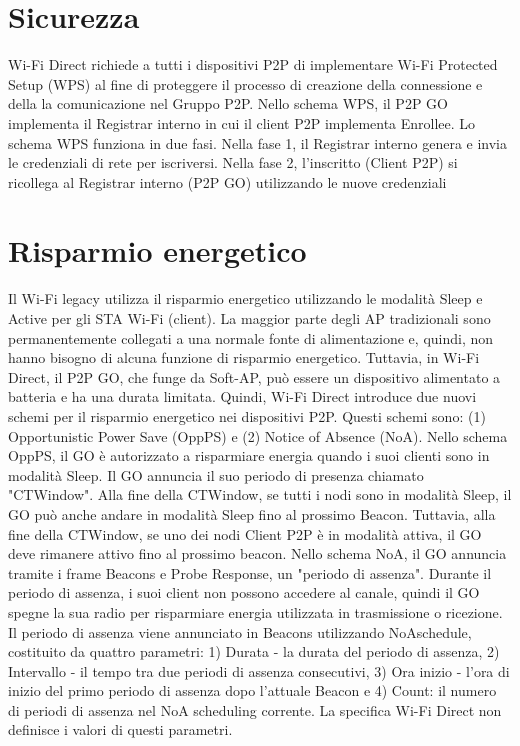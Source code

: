 \section{Sicurezza}

Wi-Fi Direct richiede a tutti i dispositivi P2P di 
implementare Wi-Fi Protected Setup (WPS) \cite{WPS} al fine di
proteggere il processo di creazione della connessione e della
la comunicazione nel Gruppo P2P. Nello schema WPS, il 
P2P GO implementa il Registrar interno in cui il client 
P2P implementa Enrollee. Lo schema WPS funziona in due fasi.
Nella fase 1, il Registrar interno genera e invia le credenziali 
di rete per iscriversi. Nella fase 2, l'inscritto (Client P2P) 
si ricollega al Registrar interno (P2P GO) utilizzando le 
nuove credenziali



\section{Risparmio energetico}

Il Wi-Fi legacy utilizza il risparmio energetico utilizzando le modalità
Sleep e Active per gli STA Wi-Fi (client). La maggior parte degli AP 
tradizionali sono permanentemente collegati a una normale fonte di 
alimentazione e, quindi, non hanno bisogno di alcuna funzione di risparmio 
energetico. Tuttavia, in Wi-Fi Direct, il P2P GO, che funge da Soft-AP,
può essere un dispositivo alimentato a batteria e ha una durata limitata.
Quindi,
Wi-Fi Direct introduce due nuovi schemi per il risparmio energetico nei 
dispositivi P2P. Questi schemi sono: (1) Opportunistic Power Save
(OppPS) e (2) Notice of Absence (NoA). Nello schema OppPS, il GO è 
autorizzato a risparmiare energia quando i suoi clienti sono in 
modalità Sleep. Il GO annuncia il suo periodo di presenza chiamato 
"CTWindow". Alla fine della CTWindow, se tutti i nodi sono in modalità 
Sleep, il GO può anche andare in modalità Sleep fino al prossimo Beacon.
Tuttavia, alla fine della CTWindow, se uno dei nodi Client P2P è in 
modalità attiva, il GO deve rimanere attivo fino al prossimo beacon.
Nello schema NoA, il GO annuncia tramite i frame Beacons e Probe
Response, un "periodo di assenza". Durante il periodo di assenza,
i suoi client non possono accedere al canale, quindi il GO spegne 
la sua radio per risparmiare energia utilizzata in trasmissione o 
ricezione. Il periodo di assenza viene annunciato in Beacons 
utilizzando NoAschedule, costituito da quattro parametri: 1) 
Durata - la durata del periodo di assenza, 2) Intervallo - il 
tempo tra due periodi di assenza consecutivi, 3) Ora inizio - 
l'ora di inizio del primo periodo di assenza dopo l'attuale Beacon 
e 4)  Count: il numero di periodi di assenza nel 
NoA scheduling corrente. La specifica Wi-Fi Direct non 
definisce i valori di questi parametri.
